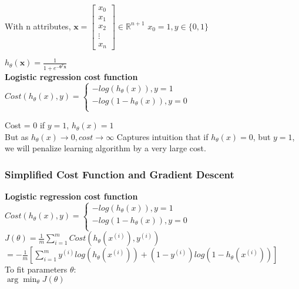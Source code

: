 \documentclass{article}
\newcommand\tab[1][1cm]{\hspace*{#1}}
\newcommand{\vect}[1]{\boldsymbol{#1}}
\begin{document}
With n attributes, $\vect{x} = \begin{bmatrix}
x_0 \\ x_1 \\ x_2 \\ \vdots \\ x_n 
\end{bmatrix} \in \mathbb{R}^{n+1}$
$x_0 = 1, y \in \{0, 1\}$

$h_\theta(\vect{x}) = \frac{1}{1 + e^{-\vect{\theta}^T \vect{x}}}$ \\

\textbf{Logistic regression cost function} \\
$Cost(h_\theta(x), y)=\left\{
                \begin{array}{ll}
                  -log(h_\theta(x)), y = 1\\
                  -log(1 - h_\theta(x)), y = 0\\
                \end{array}
              \right.$

Cost = 0 if $y = 1$, $h_\theta(x) = 1$ \\
But as $h_\theta(x) \rightarrow 0, cost \rightarrow \infty $
Captures intuition that if $h_\theta(x) = 0$, but $y = 1$, we will penalize learning algorithm by a very large cost.\\

\newpage

\subsubsection{Simplified Cost Function and Gradient Descent}
\textbf{Logistic regression cost function} \\
$Cost(h_\theta(x), y)=\left\{
                \begin{array}{ll}
                  -log(h_\theta(x)), y = 1\\
                  -log(1 - h_\theta(x)), y = 0\\
                \end{array}
              \right.$\\

$J(\theta)= \frac{1}{m}\sum_{i=1}^{m} Cost(h_\theta(x^{(i)}), y^{(i)})$ \\

$ = -\frac{1}{m}[ \sum_{i=1}^{m} y^{(i)}log(h_\theta(x^{(i)})) + (1-y^{(i)})log(1 - h_\theta(x^{(i)}))]$\\

To fit parameters $\theta$: \\
\tab $\arg\min_{\theta} J(\theta)$ \\
\end{document}
